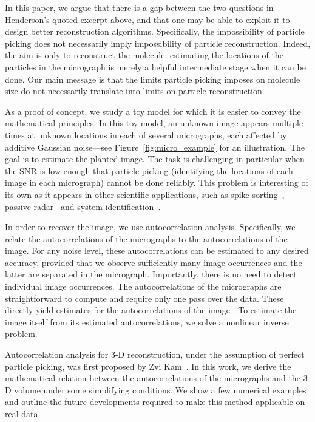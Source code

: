 \documentclass[9pt,twocolumn,twoside,lineno]{pnas-new}
\begin{document}
In this paper, we argue that there is a gap between the two questions in Henderson's quoted excerpt above, and that one may be able to exploit it to design better reconstruction algorithms.
Specifically, the impossibility of particle picking does not necessarily imply impossibility of particle reconstruction.
Indeed, the aim is only to reconstruct the molecule: estimating the locations of the particles in the micrograph is merely a helpful intermediate stage when it can be done. Our main message is that the limits particle picking imposes on molecule size do not necessarily  translate into limits on particle reconstruction.

As a proof of concept, we study a toy model for which it is easier to convey the mathematical principles. 
In this toy model, an unknown image appears multiple times at unknown locations in each of several micrographs, each affected by additive Gaussian noise---see Figure~\ref{fig:micro_example} for an illustration.
The goal is to estimate the planted image. The task is challenging in particular when the SNR is low enough that particle picking (identifying the locations of each image in each micrograph) cannot be done reliably. 
This problem is interesting of its own as it appears in other scientific applications, such as spike sorting~\cite{lewicki1998review}, passive radar~\cite{gogineni2017passive} and system identification~\cite{ljung1998system}.
 
In order to recover the image, we use autocorrelation analysis. Specifically, we relate the autocorrelations of the micrographs to the autocorrelations of the image.
For any noise level, these autocorrelations can be estimated to any desired accuracy, provided that we  observe sufficiently many image occurrences and the latter are separated in the micrograph. Importantly, there is no need to detect individual image occurrences. The autocorrelations of the micrographs are straightforward to compute and require only one pass over the data. These directly yield estimates for the autocorrelations of the image . To estimate the image itself from its estimated autocorrelations, we solve a nonlinear inverse problem. 

Autocorrelation analysis for 3-D reconstruction, under the assumption of perfect particle picking,  was first proposed by Zvi Kam~\cite{kam1980reconstruction}. 
In this work, we derive the mathematical relation between the autocorrelations of the micrographs and the 3-D volume under some simplifying conditions.
We show a few numerical examples and outline the future developments required to make this method applicable on real data. 
\end{document}

